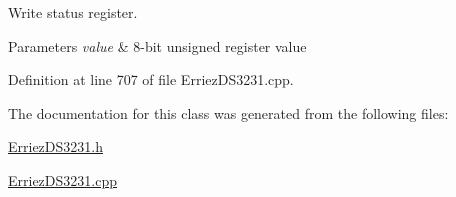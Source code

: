 Write status register. 


\begin{DoxyParams}{Parameters}
{\em value} & 8-\/bit unsigned register value \\
\hline
\end{DoxyParams}


Definition at line 707 of file Erriez\+D\+S3231.\+cpp.



The documentation for this class was generated from the following files\+:\begin{DoxyCompactItemize}
\item 
\hyperlink{_erriez_d_s3231_8h}{Erriez\+D\+S3231.\+h}\item 
\hyperlink{_erriez_d_s3231_8cpp}{Erriez\+D\+S3231.\+cpp}\end{DoxyCompactItemize}
